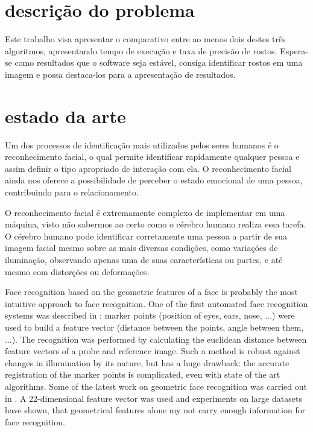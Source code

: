 
\section*{descrição do problema}

Este trabalho visa apresentar o comparativo entre ao menos dois destes três algoritmos, apresentando tempo de execução e taxa de precisão de rostos. Espera-se como resultados que o software seja estável, consiga identificar rostos em uma imagem e possa destaca-los para a apresentação de resultados.

\section*{estado da arte}

Um dos processos de identificação mais utilizados pelos seres humanos é o reconhecimento facial, o qual permite identificar rapidamente qualquer pessoa e assim definir o tipo apropriado de interação com ela. O reconhecimento facial ainda nos oferece a possibilidade de perceber o estado emocional de uma pessoa, contribuindo para o relacionamento.

O reconhecimento facial é extremamente complexo de implementar em uma máquina, visto não sabermos ao certo como o cérebro humano realiza essa tarefa. O cérebro humano pode identificar corretamente uma pessoa a partir de sua imagem facial mesmo sobre as mais diversas condições, como variações de iluminação, observando apenas uma de suas características ou partes, e até mesmo com distorções ou deformações.

Face recognition based on the geometric features of a face is probably the most intuitive approach to face recognition. One of the first automated face recognition systems was described in \cite{kanade1973picture}: marker points (position of eyes, ears, nose, ...) were used to build a feature vector (distance between the points, angle between them, ...). The recognition was performed by calculating the euclidean distance between feature vectors of a probe and reference image. Such a method is robust against changes in illumination by its nature, but has a huge drawback: the accurate registration of the marker points is complicated, even with state of the art algorithms. Some of the latest work on geometric face recognition was carried out in \cite{brunelli1992face}. A 22-dimensional feature vector was used and experiments on large datasets have shown, that geometrical features alone my not carry enough information for face recognition.

